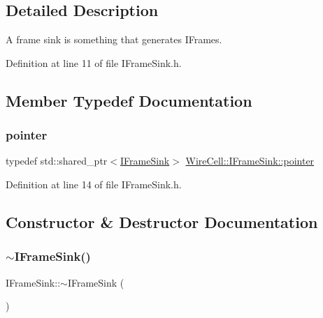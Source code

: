 \subsection{Detailed Description}
A frame sink is something that generates I\+Frames. 

Definition at line 11 of file I\+Frame\+Sink.\+h.



\subsection{Member Typedef Documentation}
\mbox{\label{class_wire_cell_1_1_i_frame_sink_afa2121ec1bfe992a2fe80c79c4a80aa0}} 
\subsubsection{\texorpdfstring{pointer}{pointer}}
{\footnotesize\ttfamily typedef std\+::shared\+\_\+ptr$<$\hyperlink{class_wire_cell_1_1_i_frame_sink}{I\+Frame\+Sink}$>$ \hyperlink{class_wire_cell_1_1_i_frame_sink_afa2121ec1bfe992a2fe80c79c4a80aa0}{Wire\+Cell\+::\+I\+Frame\+Sink\+::pointer}}



Definition at line 14 of file I\+Frame\+Sink.\+h.



\subsection{Constructor \& Destructor Documentation}
\mbox{\label{class_wire_cell_1_1_i_frame_sink_a4f82d5eaca846b5963b3fc88b238811e}} 
\subsubsection{\texorpdfstring{$\sim$\+I\+Frame\+Sink()}{~IFrameSink()}}
{\footnotesize\ttfamily I\+Frame\+Sink\+::$\sim$\+I\+Frame\+Sink (\begin{DoxyParamCaption}{ }\end{DoxyParamCaption})\hspace{0.3cm}{\ttfamily [virtual]}}



